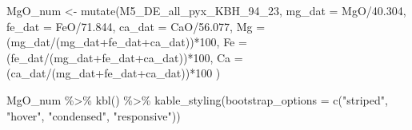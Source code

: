 \documentclass[
]{article}
\newenvironment{Shaded}{\begin{snugshade}}{\end{snugshade}}
\newcommand{\AttributeTok}[1]{\textcolor[rgb]{0.77,0.63,0.00}{#1}}
\newcommand{\DecValTok}[1]{\textcolor[rgb]{0.00,0.00,0.81}{#1}}
\newcommand{\FloatTok}[1]{\textcolor[rgb]{0.00,0.00,0.81}{#1}}
\newcommand{\FunctionTok}[1]{\textcolor[rgb]{0.00,0.00,0.00}{#1}}
\newcommand{\NormalTok}[1]{#1}
\newcommand{\OtherTok}[1]{\textcolor[rgb]{0.56,0.35,0.01}{#1}}
\newcommand{\SpecialCharTok}[1]{\textcolor[rgb]{0.00,0.00,0.00}{#1}}
\newcommand{\StringTok}[1]{\textcolor[rgb]{0.31,0.60,0.02}{#1}}
\begin{document}
\begin{Shaded}
\begin{Highlighting}[]
\NormalTok{MgO\_num }\OtherTok{\textless{}{-}} \FunctionTok{mutate}\NormalTok{(M5\_DE\_all\_pyx\_KBH\_94\_23, }\AttributeTok{mg\_dat =}\NormalTok{ MgO}\SpecialCharTok{/}\FloatTok{40.304}\NormalTok{,}
                  \AttributeTok{fe\_dat =}\NormalTok{ FeO}\SpecialCharTok{/}\FloatTok{71.844}\NormalTok{,}
                  \AttributeTok{ca\_dat =}\NormalTok{ CaO}\SpecialCharTok{/}\FloatTok{56.077}\NormalTok{,}
                  \AttributeTok{Mg =}\NormalTok{ (mg\_dat}\SpecialCharTok{/}\NormalTok{(mg\_dat}\SpecialCharTok{+}\NormalTok{fe\_dat}\SpecialCharTok{+}\NormalTok{ca\_dat))}\SpecialCharTok{*}\DecValTok{100}\NormalTok{,}
                  \AttributeTok{Fe =}\NormalTok{ (fe\_dat}\SpecialCharTok{/}\NormalTok{(mg\_dat}\SpecialCharTok{+}\NormalTok{fe\_dat}\SpecialCharTok{+}\NormalTok{ca\_dat))}\SpecialCharTok{*}\DecValTok{100}\NormalTok{,}
                  \AttributeTok{Ca =}\NormalTok{ (ca\_dat}\SpecialCharTok{/}\NormalTok{(mg\_dat}\SpecialCharTok{+}\NormalTok{fe\_dat}\SpecialCharTok{+}\NormalTok{ca\_dat))}\SpecialCharTok{*}\DecValTok{100}
\NormalTok{                  )}
                  
\NormalTok{MgO\_num }\SpecialCharTok{\%\textgreater{}\%} 
  \FunctionTok{kbl}\NormalTok{() }\SpecialCharTok{\%\textgreater{}\%} 
  \FunctionTok{kable\_styling}\NormalTok{(}\AttributeTok{bootstrap\_options =} \FunctionTok{c}\NormalTok{(}\StringTok{"striped"}\NormalTok{, }\StringTok{"hover"}\NormalTok{, }\StringTok{"condensed"}\NormalTok{, }\StringTok{"responsive"}\NormalTok{))}
\end{Highlighting}
\end{Shaded}
\end{document}
